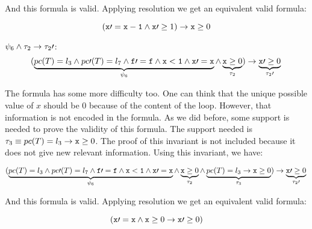 	And this formula is valid. Applying resolution we get an equivalent valid formula:

	\[
		( \mathtt{x\prime =x-1} \wedge \mathtt{x\prime }\geq 1) \to \mathtt{x} \geq 0
	\]


	\; $\psi_6 \wedge \tau_2 \to \tau_2\prime $:
	\begin{equation*}
		(
			\underbrace{pc(T) = l_3 \wedge pc\prime (T) = l_7 \wedge \mathtt{f\prime =f} \wedge \mathtt{x<1} \wedge \mathtt{x\prime =x} }_{\psi_6} \wedge \underbrace{\mathtt{x} \geq 0}_{\tau_2}
		) 
			\to \underbrace{\mathtt{x}\prime  \geq 0}_{\tau_2\prime }\\\\
	\end{equation*}


	The formula has some more difficulty too.
	One can think that the unique possible value of $x$ should be $0$ because of the content of the loop.
	However, that information is not encoded in the formula.
	As we did before, some support is needed to prove the validity of this formula.
	The support needed is $\tau_3 \equiv pc(T) = l_3 \to \mathtt{x} \geq 0$.
	The proof of this invariant is not included because it does not give new relevant information. 
	Using this invariant, we have:

	

	\begin{equation*}
		(
			\underbrace{pc(T) = l_3 \wedge pc\prime (T) = l_7 \wedge \mathtt{f\prime =f} \wedge \mathtt{x<1} \wedge \mathtt{x\prime =x}}_{\psi_6} \wedge \underbrace{\mathtt{x} \geq 0}_{\tau_2} \wedge \underbrace{pc(T) = l_3 \to \mathtt{x}\geq 0 }_{\tau_3}
		) 
			\to \underbrace{\mathtt{x}\prime  \geq 0}_{\tau_2\prime }\\\\
	\end{equation*}

	
	And this formula is valid. Applying resolution we get an equivalent valid formula:

	\[
		(
			\mathtt{x\prime =x}  \wedge \mathtt{x}\geq 0 \to \mathtt{x\prime }\geq 0
		)
	\]


